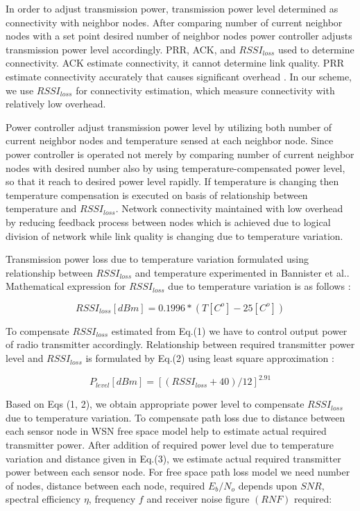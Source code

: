 \documentclass{article}
\begin{document}
In order to adjust transmission power, transmission power level determined as connectivity with neighbor nodes. After comparing number of current neighbor nodes with a set point desired number of neighbor nodes power controller adjusts transmission power level accordingly. PRR, ACK, and $RSSI_{loss}$ used to determine connectivity. ACK estimate connectivity, it cannot determine link quality. PRR estimate connectivity accurately that causes significant overhead \cite{6}. In our scheme, we use $RSSI_{loss}$ for connectivity estimation, which measure connectivity with relatively low overhead.


Power controller adjust transmission power level by utilizing both number of current neighbor nodes and temperature sensed at each neighbor node. Since power controller is operated not merely by comparing number of current neighbor nodes with desired number also by using temperature-compensated power level, so that it reach to desired power level rapidly. If temperature is changing then temperature compensation is executed on basis of relationship between temperature and $RSSI_{loss}$. Network connectivity maintained with low overhead by reducing feedback process between nodes which is achieved due to logical division of network while link quality is changing due to temperature variation.


Transmission power loss due to temperature variation formulated using relationship between $RSSI_{loss}$ and temperature experimented in Bannister et al.. Mathematical expression for $RSSI_{loss}$ due to temperature variation is as follows \cite{7}:

\begin{equation}
RSSI_{loss}[dBm]=0.1996*(T[C^{o}]-25[C^{o}])
\end{equation}

To compensate $RSSI_{loss}$ estimated from Eq.(1) we have to control output power of radio transmitter accordingly. Relationship between required transmitter power level and $RSSI_{loss}$ is formulated by Eq.(2) using least square approximation \cite{7}:

\begin{equation}
P_{level}[dBm]=[(RSSI_{loss}+40)/12]^{2.91}
\end{equation}

Based on Eqs (1, 2), we obtain appropriate power level to compensate $RSSI_{loss}$ due to temperature variation. To compensate path loss due to distance  between each sensor node in WSN free space model help to estimate actual required transmitter power. After addition of required power level due to temperature variation and distance given in Eq.(3), we estimate actual required transmitter power between each sensor node. For free space path loss model  we need number of nodes, distance between each node, required $E_{b}/N_{o}$ depends upon $SNR$, spectral efficiency $\eta$, frequency $f$ and receiver noise figure $(RNF)$ required:
\end{document}
